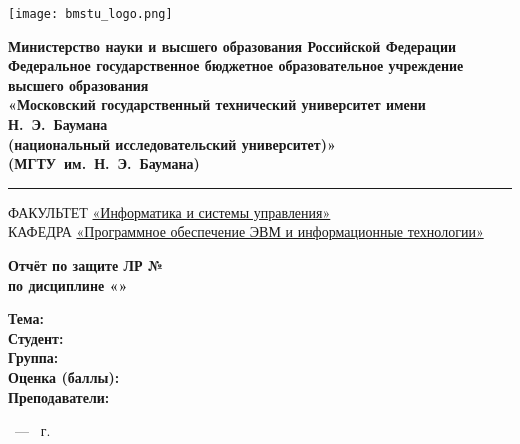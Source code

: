 \thispagestyle{empty}

\begin{titlepage}
	\noindent \begin{minipage}{0.1\textwidth}
	\texttt{[image: bmstu\_logo.png]}
	\end{minipage}
	\noindent\begin{minipage}{0.9\textwidth}\centering
		\textbf{Министерство науки и высшего образования Российской Федерации}\\
		\textbf{Федеральное государственное бюджетное образовательное учреждение высшего образования}\\
		\textbf{«Московский государственный технический университет имени Н.~Э.~Баумана}\\
		\textbf{(национальный исследовательский университет)»}\\
		\textbf{(МГТУ~им.~Н.~Э.~Баумана)}
	\end{minipage}
	
	\vspace{7pt}
	
	\noindent\rule{\textwidth}{2pt}
	
	\vspace{7pt}
	
	\noindent ФАКУЛЬТЕТ \underline{«Информатика и системы управления»} \\
	\noindent КАФЕДРА \underline{«Программное обеспечение ЭВМ и информационные технологии»}
	
	\vspace{2.5cm}
	
	\begin{center}
		\Large\textbf{Отчёт по защите ЛР №\labNumber} \\
		\Large\textbf{по дисциплине «\subjectName»} \\
	\end{center}
	
	\vspace{2.5cm}
	
	\noindent\textbf{Тема:} \underline{\labTheme} \\
	\noindent\textbf{Студент:} \underline{\student} \\
	\noindent\textbf{Группа:} \underline{\group} \\
	\noindent\textbf{Оценка (баллы):} \underline{\hspace{0.2\textwidth}}\\
	\noindent\textbf{Преподаватели:} \underline{\teachers}\\
	
	\vspace*{\fill}
	
	\begin{center}
	\city~--- \the\year{}~г.	
	\end{center}

\end{titlepage}

\newpage

